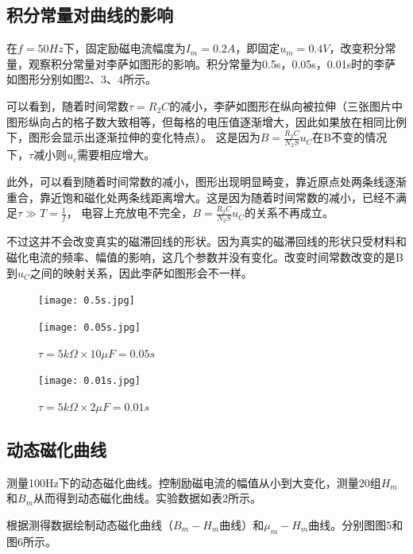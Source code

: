\documentclass{article}
\begin{document}
    \subsection{积分常量对曲线的影响}
    在$f=50Hz$下，固定励磁电流幅度为$I_m=0.2A$，即固定$u_m=0.4V$，改变积分常量，观察积分常量对李萨如图形的影响。积分常量为0.5s，0.05s，0.01s时的李萨如图形分别如图2、3、4所示。

    可以看到，随着时间常数$\tau=R_2C$的减小，李萨如图形在纵向被拉伸（三张图片中图形纵向占的格子数大致相等，但每格的电压值逐渐增大，因此如果放在相同比例下，图形会显示出逐渐拉伸的变化特点）。
    这是因为$B=\frac{R_{2} C}{N_{2} S} u_{C}$在B不变的情况下，$\tau$减小则$u_c$需要相应增大。

    此外，可以看到随着时间常数的减小，图形出现明显畸变，靠近原点处两条线逐渐重合，靠近饱和磁化处两条线距离增大。这是因为随着时间常数的减小，已经不满足$\tau\gg T=\frac{1}{f}$，
    电容上充放电不完全，$B=\frac{R_{2} C}{N_{2} S} u_{C}$的关系不再成立。

    不过这并不会改变真实的磁滞回线的形状。因为真实的磁滞回线的形状只受材料和磁化电流的频率、幅值的影响，这几个参数并没有变化。改变时间常数改变的是B到$u_C$之间的映射关系，因此李萨如图形会不一样。

    \begin{figure}[htb]
        \centering
        \begin{minipage}{0.48\textwidth}
            \texttt{[image: 0.5s.jpg]}
            \caption{$\tau=50k\Omega\times 10\mu F=0.5s$} 
        \end{minipage}
        \begin{minipage}{0.48\textwidth}
            \texttt{[image: 0.05s.jpg]}
            \caption{$\tau=5k\Omega\times 10\mu F=0.05s$} 
        \end{minipage}
    \end{figure}
    
    \begin{figure}[htb]
        \centering
        \texttt{[image: 0.01s.jpg]}
        \caption{$\tau=5k\Omega\times 2\mu F=0.01s$}
    \end{figure}

    \subsection{动态磁化曲线}
    测量100Hz下的动态磁化曲线。控制励磁电流的幅值从小到大变化，测量20组$H_m$和$B_m$从而得到动态磁化曲线。实验数据如表2所示。
    
    根据测得数据绘制动态磁化曲线（$B_m-H_m$曲线）和$\mu_m-H_m$曲线。分别图图5和图6所示。
\end{document}
